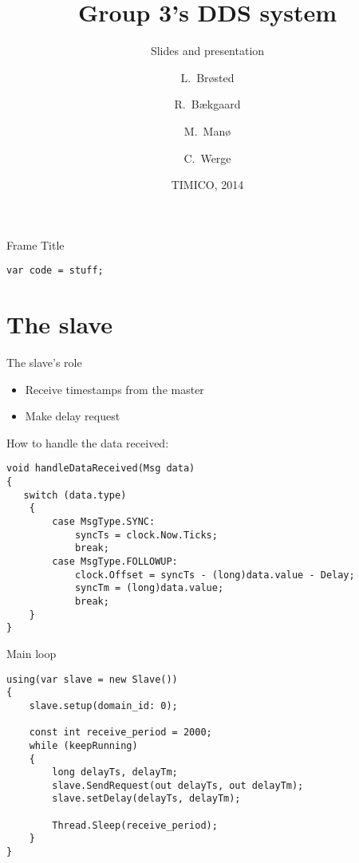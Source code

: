 \documentclass[compressed, presentation, notheorems, 12pt]{beamer}
\title{Group 3's DDS system}
\subtitle{Slides and presentation}
\author[Author, Anders] %
{L.~Brøsted \and R.~Bækgaard \and M.~Manø \and C.~Werge}
\institute
{
  Aarhus University \\
  School of Engineering
}
\date{TIMICO, 2014}
\begin{document}
 	\frame{\titlepage}
	

	\begin{frame}[fragile]{Frame Title}
	
	\begin{lstlisting}[caption=Overskrift på boks, style=Code-C++, label=lst:referenceLabel]
	var code = stuff;
	\end{lstlisting}
	
	\end{frame}

	
\section{The slave}
	\begin{frame}{The slave's role}	

	\begin{itemize}
		\item Receive timestamps from the master
		\item Make delay request
	\end{itemize}
	
	\end{frame}


	\begin{frame}[containsverbatim]

	How to handle the data received:
	\begin{lstlisting}[style=Code-C++]
void handleDataReceived(Msg data)
{
   switch (data.type)
	{
		case MsgType.SYNC:
			syncTs = clock.Now.Ticks;
			break;
		case MsgType.FOLLOWUP:
			clock.Offset = syncTs - (long)data.value - Delay;
			syncTm = (long)data.value;
			break;
	}
}
	\end{lstlisting}
	\end{frame}

	\begin{frame}[containsverbatim]{Main loop}
	
	\begin{lstlisting}[style=Code-C++]
using(var slave = new Slave())
{
	slave.setup(domain_id: 0);
	
	const int receive_period = 2000; 
	while (keepRunning)
	{
		long delayTs, delayTm;
		slave.SendRequest(out delayTs, out delayTm);
		slave.setDelay(delayTs, delayTm);

		Thread.Sleep(receive_period);
	}
}
	\end{lstlisting}

	\end{frame}
\end{document}
